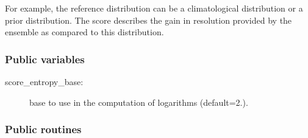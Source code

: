 \documentclass[11pt]{article}
\begin{document}
\noindent
For example, the reference distribution can be a climatological distribution or a prior distribution.
The score describes the gain in resolution provided by the ensemble as compared to this distribution.

\subsubsection*{Public variables}

\begin{description}
\item[score\_entropy\_base:] base to use in the computation of logarithms (default=2.).
\end{description}

\subsubsection*{Public routines}
\end{document}
